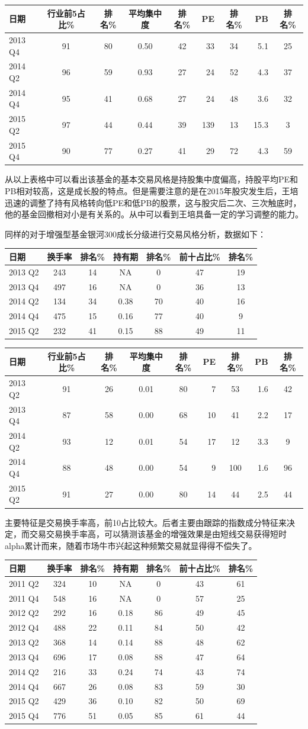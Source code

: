 \documentclass[hyperref,]{ctexart}
\begin{document}
\begin{longtable}[]{@{}lccccrcrc@{}}
\toprule
日期 & 行业前5占比\% & 排名\% & 平均集中度 & 排名\% & PE & 排名\% & PB &
排名\%\tabularnewline
\midrule
\endhead
2013 Q4 & 91 & 80 & 0.50 & 42 & 33 & 34 & 5.1 & 25\tabularnewline
2014 Q2 & 96 & 59 & 0.93 & 27 & 24 & 52 & 4.3 & 37\tabularnewline
2014 Q4 & 95 & 41 & 0.68 & 27 & 24 & 48 & 3.6 & 32\tabularnewline
2015 Q2 & 97 & 44 & 0.44 & 39 & 139 & 13 & 15.3 & 3\tabularnewline
2015 Q4 & 90 & 77 & 0.27 & 41 & 29 & 72 & 4.3 & 59\tabularnewline
\bottomrule
\end{longtable}

从以上表格中可以看出该基金的基本交易风格是持股集中度偏高，持股平均PE和PB相对较高，这是成长股的特点。但是需要注意的是在2015年股灾发生后，王培迅速的调整了持有风格转向低PE和低PB的股票，这与股灾后二次、三次触底时，他的基金回撤相对小是有关系的。从中可以看到王培具备一定的学习调整的能力。

同样的对于增强型基金银河300成长分级进行交易风格分析，数据如下：

\begin{longtable}[]{@{}lcccccc@{}}
\toprule
日期 & 换手率 & 排名\% & 持有期 & 排名\% & 前十占比\% &
排名\%\tabularnewline
\midrule
\endhead
2013 Q2 & 243 & 14 & NA & 0 & 47 & 19\tabularnewline
2013 Q4 & 497 & 16 & NA & 0 & 36 & 13\tabularnewline
2014 Q2 & 134 & 34 & 0.38 & 70 & 40 & 16\tabularnewline
2014 Q4 & 475 & 15 & 0.16 & 77 & 40 & 9\tabularnewline
2015 Q2 & 232 & 41 & 0.15 & 88 & 49 & 11\tabularnewline
\bottomrule
\end{longtable}

\begin{longtable}[]{@{}lccccrcrc@{}}
\toprule
日期 & 行业前5占比\% & 排名\% & 平均集中度 & 排名\% & PE & 排名\% & PB &
排名\%\tabularnewline
\midrule
\endhead
2013 Q2 & 91 & 26 & 0.01 & 80 & 7 & 53 & 1.6 & 42\tabularnewline
2013 Q4 & 87 & 58 & 0.00 & 68 & 10 & 41 & 2.2 & 17\tabularnewline
2014 Q2 & 93 & 12 & 0.01 & 54 & 17 & 12 & 3.3 & 9\tabularnewline
2014 Q4 & 88 & 48 & 0.00 & 54 & 9 & 100 & 1.6 & 96\tabularnewline
2015 Q2 & 91 & 27 & 0.00 & 80 & 14 & 44 & 2.5 & 44\tabularnewline
\bottomrule
\end{longtable}

主要特征是交易换手率高，前10占比较大。后者主要由跟踪的指数成分特征来决定，而交易交易换手率高，可以猜测该基金的增强效果是由短线交易获得短时alpha累计而来，随着市场牛市兴起这种频繁交易就显得得不偿失了。

\begin{longtable}[]{@{}lcccccc@{}}
\toprule
日期 & 换手率 & 排名\% & 持有期 & 排名\% & 前十占比\% &
排名\%\tabularnewline
\midrule
\endhead
2011 Q2 & 324 & 10 & NA & 0 & 43 & 61\tabularnewline
2011 Q4 & 548 & 16 & NA & 0 & 57 & 25\tabularnewline
2012 Q2 & 292 & 16 & 0.18 & 86 & 49 & 45\tabularnewline
2012 Q4 & 488 & 22 & 0.11 & 84 & 50 & 42\tabularnewline
2013 Q2 & 368 & 14 & 0.14 & 88 & 48 & 62\tabularnewline
2013 Q4 & 696 & 17 & 0.08 & 88 & 47 & 64\tabularnewline
2014 Q2 & 216 & 33 & 0.24 & 74 & 43 & 74\tabularnewline
2014 Q4 & 667 & 26 & 0.08 & 83 & 59 & 30\tabularnewline
2015 Q2 & 429 & 36 & 0.10 & 82 & 50 & 69\tabularnewline
2015 Q4 & 776 & 51 & 0.05 & 85 & 61 & 44\tabularnewline
\bottomrule
\end{longtable}
\end{document}
